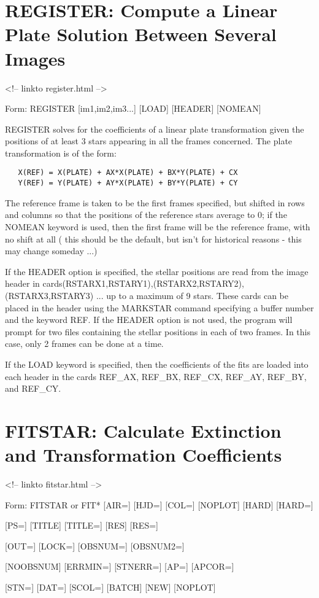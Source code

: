\section{REGISTER: Compute a Linear Plate Solution Between Several Images}
\begin{rawhtml}
<!-- linkto register.html -->
\end{rawhtml}
\begin{command}
  \item[Form: REGISTER {[im1,im2,im3...]} {[LOAD]} {[HEADER]} {[NOMEAN]}\hfill]{}
\end{command}

REGISTER solves for the coefficients of a linear plate transformation given
the positions of at least 3 stars appearing in all the frames
concerned. The plate transformation is of the form:
\begin{verbatim}
   X(REF) = X(PLATE) + AX*X(PLATE) + BX*Y(PLATE) + CX
   Y(REF) = Y(PLATE) + AY*X(PLATE) + BY*Y(PLATE) + CY
\end{verbatim}
The reference frame is taken to be the first frames specified, but shifted
in rows and columns so that the positions of the reference stars average to
0; if the NOMEAN keyword is used, then the first frame will be the
reference frame, with no shift at all ( this should be the default, but
isn't for historical reasons - this may change someday ...)

If the HEADER option is specified, the stellar positions are read from the
image header in cards(RSTARX1,RSTARY1),(RSTARX2,RSTARY2), (RSTARX3,RSTARY3)
... up to a maximum of 9 stars.  These cards can be placed in the header
using the MARKSTAR command specifying a buffer number and the keyword
REF. If the HEADER option is not used, the program will prompt for two
files containing the stellar positions in each of two frames. In this case,
only 2 frames can be done at a time.

If the LOAD keyword is specified, then the coefficients of the fits are
loaded into each header in the cards REF\_AX, REF\_BX, REF\_CX, REF\_AY,
REF\_BY, and REF\_CY.

\section{FITSTAR: Calculate Extinction and Transformation Coefficients}
\begin{rawhtml}
<!-- linkto fitstar.html -->
\end{rawhtml}
\begin{command}
  \item[Form: FITSTAR or FIT* {[AIR=]} {[HJD=]} {[COL=]} {[NOPLOT]} {[HARD]} {[HARD=]}\hfill]{}
  \item{{[PS=]} {[TITLE]} {[TITLE=]} {[RES]} {[RES=]} }
  \item{{[OUT=]} {[LOCK=]} {[OBSNUM=]} {[OBSNUM2=]}}
  \item{{[NOOBSNUM]} {[ERRMIN=]} {[STNERR=]} {[AP=]} {[APCOR=]}}
  \item{{[STN=]} {[DAT=]} {[SCOL=]} {[BATCH]} {[NEW]} {[NOPLOT]} }
\end{command}

